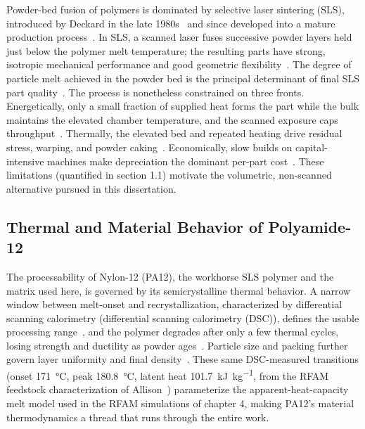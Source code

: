 Powder-bed fusion of polymers is dominated by selective laser sintering
(SLS), introduced by Deckard in the late 1980s~\cite{deckard1989method} and
since developed into a mature production
process~\cite{gibson2015additive,Beaman2020AdditiveMR,lupone2021process}. In
SLS, a scanned laser fuses successive powder layers held just below the
polymer melt temperature; the resulting parts have strong, isotropic mechanical
performance and good geometric flexibility~\cite{jabri2023comprehensive,peyre2015sls,xiao2024sls}.
The degree of particle melt achieved in the powder bed is the principal determinant
of final SLS part quality~\cite{Zarringhalam2009}. The
process is nonetheless constrained on three fronts. Energetically, only a small
fraction of supplied heat forms the part while the bulk maintains the elevated
chamber temperature, and the scanned exposure caps throughput~\cite{lupone2021process,deckard1995improved}.
Thermally, the elevated bed and repeated heating drive residual stress, warping,
and powder caking~\cite{bourell2014performance}.
Economically, slow builds on capital-intensive machines make depreciation the
dominant per-part cost~\cite{khajavi2014spareparts,baumers2011capacityutilization,lindemann2012lifecyclecosts,rickenbacher2013slmcostmodel,yao2016cost}.
These limitations (quantified in section 1.1) motivate the
volumetric, non-scanned alternative pursued in this dissertation.

\subsection{Thermal and Material Behavior of Polyamide-12}
\label{sec:intro_bg_pa12}

The processability of Nylon-12 (PA12), the workhorse SLS polymer and the
matrix used here, is governed by its semicrystalline thermal behavior. A narrow
window between melt-onset and recrystallization, characterized by differential
scanning calorimetry (differential scanning calorimetry (DSC)), defines the usable processing
range~\cite{zhao2018crystallization,affolter2001interlaboratory}, and the polymer
degrades after only a few thermal cycles, losing strength and ductility as powder
ages~\cite{verbelen2016characterization,zarringhalam2006effects,pham2008deterioration,choren2001sls,gornet2002characterization}.
Particle size and packing further govern layer uniformity and final
density~\cite{mokrane2018process}. These same DSC-measured transitions
(onset \SI{171}{\celsius}, peak \SI{180.8}{\celsius}, latent heat
\SI{101.7}{\kilo\joule\per\kilogram}, from the RFAM feedstock characterization of
Allison~\cite{allisonDissertation}) parameterize the apparent-heat-capacity melt
model used in the RFAM simulations of chapter 4, making PA12's
material thermodynamics a thread that runs through the entire work.

